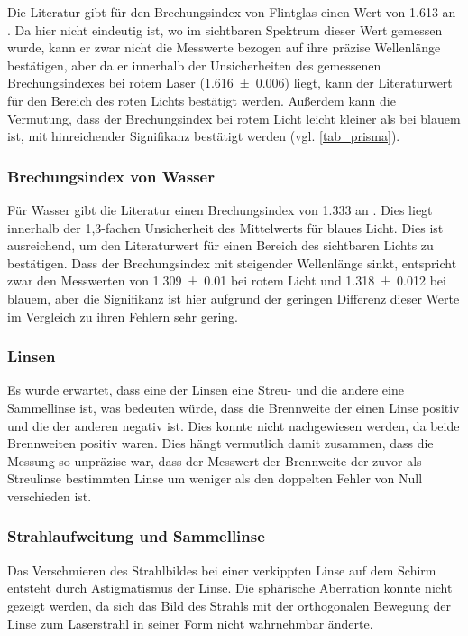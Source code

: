 \documentclass[
	a4paper,
	12pt,
	pagesize,
	ngerman
]{scrartcl}
\begin{document}
	Die Literatur gibt für den Brechungsindex von Flintglas einen Wert von \SI{1,613}{} an \cite{flintglasref}.
	Da hier nicht eindeutig ist, wo im sichtbaren Spektrum dieser Wert gemessen wurde, kann er zwar nicht die Messwerte bezogen auf ihre präzise Wellenlänge bestätigen, aber da er innerhalb der Unsicherheiten des gemessenen Brechungsindexes bei rotem Laser (\SI{1,616 \pm 0,006}{}) liegt, kann der Literaturwert für den Bereich des roten Lichts bestätigt werden.
	Außerdem kann die Vermutung, dass der Brechungsindex bei rotem Licht leicht kleiner als bei blauem ist, mit hinreichender Signifikanz bestätigt werden (vgl. \cref{tab_prisma}).
	
	\subsubsection{Brechungsindex von Wasser}
	Für Wasser gibt die Literatur einen Brechungsindex von \SI{1,333}{} an \cite{flintglasref}.
	Dies liegt innerhalb der 1,3-fachen Unsicherheit des Mittelwerts für blaues Licht.
	Dies ist ausreichend, um den Literaturwert für einen Bereich des sichtbaren Lichts zu bestätigen.
	Dass der Brechungsindex mit steigender Wellenlänge sinkt, entspricht zwar den Messwerten von \SI{1,309 \pm 0,01}{} bei rotem Licht und \SI{1,318 \pm 0,012}{} bei blauem, aber die Signifikanz ist hier aufgrund der geringen Differenz dieser Werte im Vergleich zu ihren Fehlern sehr gering.
	
	\subsubsection{Linsen}
	
	Es wurde erwartet, dass eine der Linsen eine Streu- und die andere eine Sammellinse ist, was bedeuten würde, dass die Brennweite der einen Linse positiv und die der anderen negativ ist.
	Dies konnte nicht nachgewiesen werden, da beide Brennweiten positiv waren.
	Dies hängt vermutlich damit zusammen, dass die Messung so unpräzise war, dass der Messwert der Brennweite der zuvor als Streulinse bestimmten Linse um weniger als den doppelten Fehler von Null verschieden ist. %
	
	\subsubsection{Strahlaufweitung und Sammellinse}
	Das Verschmieren des Strahlbildes bei einer verkippten Linse auf dem Schirm entsteht durch Astigmatismus der Linse. %
	Die sphärische Aberration konnte nicht gezeigt werden, da sich das Bild des Strahls mit der orthogonalen Bewegung der Linse zum Laserstrahl in seiner Form nicht wahrnehmbar änderte.
\end{document}
